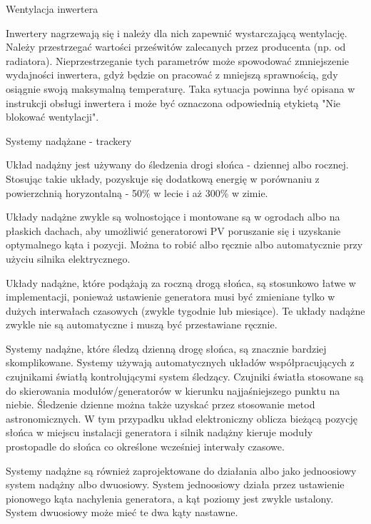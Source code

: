 \documentclass[12pt,a4paper]{article}
\begin{document}
 

Wentylacja inwertera 

Inwertery nagrzewają się i należy dla nich zapewnić wystarczającą 
wentylację. Należy przestrzegać wartości prześwitów zalecanych przez 
producenta (np. od radiatora). Nieprzestrzeganie tych parametrów może 
spowodować zmniejszenie wydajności inwertera, gdyż będzie on pracować z 
mniejszą sprawnością, gdy osiągnie swoją maksymalną temperaturę. Taka 
sytuacja powinna być opisana w instrukcji obsługi inwertera i może być 
oznaczona odpowiednią etykietą "Nie blokować wentylacji". 

 

Systemy nadążane - trackery 

Układ nadążny jest używany do śledzenia drogi słońca - dziennej albo 
rocznej. Stosując takie układy, pozyskuje się dodatkową energię w 
porównaniu z powierzchnią horyzontalną - 50\% w lecie i aż 300\% w 
zimie. 

 

Układy nadążne zwykle są wolnostojące i montowane są w ogrodach albo na 
płaskich dachach, aby umożliwić generatorowi PV poruszanie się i 
uzyskanie optymalnego kąta i pozycji. Można to robić albo ręcznie albo 
automatycznie przy użyciu silnika elektrycznego. 

 

Układy nadążne, które podążają za roczną drogą słońca, są stosunkowo 
łatwe w implementacji, ponieważ ustawienie generatora musi być zmieniane 
tylko w dużych interwałach czasowych (zwykle tygodnie lub miesiące). Te 
układy nadążne zwykle nie są automatyczne i muszą być przestawiane 
ręcznie. 

 

Systemy nadążne, które śledzą dzienną drogę słońca, są znacznie bardziej 
skomplikowane. Systemy używają automatycznych układów współpracujących z 
czujnikami światłą kontrolującymi system śledzący. Czujniki światła 
stosowane są do skierowania modułów/generatorów w kierunku 
najjaśniejszego punktu na niebie. Śledzenie dzienne można także uzyskać 
przez stosowanie metod astronomicznych. W tym przypadku układ 
elektroniczny oblicza bieżącą pozycję słońca w miejscu instalacji 
generatora i silnik nadążny kieruje moduły prostopadle do słońca co 
określone wcześniej interwały czasowe. 

 

Systemy nadążne są również zaprojektowane do działania albo jako 
jednoosiowy system nadążny albo dwuosiowy. System jednoosiowy działa 
przez ustawienie pionowego kąta nachylenia generatora, a kąt poziomy 
jest zwykle ustalony. System dwuosiowy może mieć te dwa kąty nastawne. 
\end{document}
